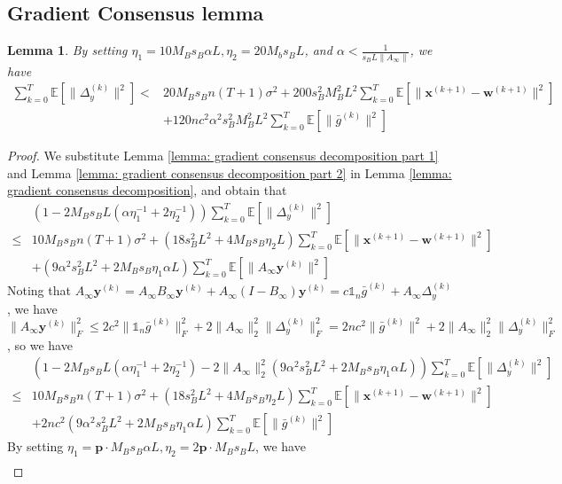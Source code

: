 \documentclass{article}
\newtheorem{lemma}[thm]{Lemma}
\newcommand{\vw}{{\mathbf{w}}}
\newcommand{\vx}{{\mathbf{x}}}
\newcommand{\vy}{{\mathbf{y}}}
\newcommand{\EE}[1]{\mathbb{E}\left[#1\right]}
\newcommand{\norm}[1]{\| #1 \|}
\newcommand{\one}{\mathds{1}_n}
\begin{document}
\subsection{Gradient Consensus lemma}
\begin{lemma}
By setting $\eta_1=10M_Bs_B\alpha L,\eta_2=20M_bs_BL$, and $\alpha < \frac{1}{s_BL\norm{A_{\infty}}}$, we have
  \begin{align*}
    \sum_{k=0}^T \EE{\norm{\Delta_y^{(k)}}^2}
  <&20M_Bs_Bn (T+1)\sigma^2+200s_B^2M_B^2L^2\sum_{k=0}^T\EE{\norm{\vx^{(k+1)}-\vw^{(k+1)}}^2}\\&+120nc^2\alpha^2s_B^2M_B^2L^2 \sum_{k=0}^T \EE{\norm{\bar{g}^{(k)}}^2}
\end{align*}
\end{lemma}
\begin{proof}
We substitute Lemma \ref{lemma: gradient consensus decomposition part 1} and Lemma \ref{lemma: gradient consensus decomposition part 2} in Lemma \ref{lemma: gradient consensus decomposition}, and obtain that 
\begin{align*}
  &\left(1-2M_Bs_BL(\alpha\eta_1^{-1}+2\eta_2^{-1})\right)\sum_{k=0}^T \EE{\norm{\Delta_y^{(k)}}^2}\\ 
  \leq &10M_Bs_Bn(T+1)\sigma^2+(18s_B^2L^2+4M_Bs_B\eta_2 L)\sum_{k=0}^T\EE{\norm{\vx^{(k+1)}-\vw^{(k+1)}}^2}\\&+(9\alpha^2s_B^2L^2+2M_Bs_B\eta_1\alpha L) \sum_{k=0}^T \EE{\norm{A_{\infty}\vy^{(k)}}^2}
\end{align*}
Noting that $A_{\infty}\vy^{(k)}=A_{\infty}B_{\infty}\vy^{(k)}+ A_{\infty}(I-B_{\infty})\vy^{(k)}=c\one\bar{g}^{(k)}+A_{\infty}\Delta_{y}^{(k)}$, we have $\norm{A_{\infty }\vy^{(k)}}^2_F\leq 2c^2 \norm{\one\bar{g}^{(k)}}_F^2+2 \norm{A_{\infty}}_2^2\norm{\Delta_y^{(k)}}_F^2= 2 nc^2 \norm{\bar{g}^{(k)}}^2+ 2\norm{A_{\infty}}_2^2\norm{\Delta_y^{(k)}}_F^2$, so we have
\begin{align*}
  &\left(1-2M_Bs_BL(\alpha\eta_1^{-1}+2\eta_2^{-1})-2\norm{A_{\infty}}_2^2(9\alpha^2s_B^2L^2+2M_Bs_B\eta_1\alpha L) \right)\sum_{k=0}^T \EE{\norm{\Delta_y^{(k)}}^2}\\ 
  \leq &10M_Bs_Bn (T+1)\sigma^2+(18s_B^2L^2+4M_Bs_B\eta_2 L)\sum_{k=0}^T\EE{\norm{\vx^{(k+1)}-\vw^{(k+1)}}^2}\\&+2nc^2(9\alpha^2s_B^2L^2+2M_Bs_B\eta_1\alpha L) \sum_{k=0}^T \EE{\norm{\bar{g}^{(k)}}^2}
\end{align*}
By setting $\eta_1=\mathbf{p}\cdot M_Bs_B\alpha L,\eta_2=2\mathbf{p}\cdot M_Bs_BL$, we have
\begin{align*}

\end{align*}
\end{proof}
\end{document}
